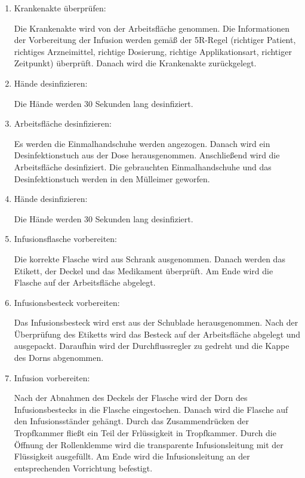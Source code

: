   \begin{enumerate}[start=0]
      \item Krankenakte überprüfen:
      
      Die Krankenakte wird von der Arbeitsfläche genommen. Die Informationen der Vorbereitung der Infusion werden gemäß der 5R-Regel (richtiger Patient, richtiges Arzneimittel, richtige Dosierung, richtige Applikationsart, richtiger Zeitpunkt) überprüft. Danach wird die Krankenakte zurückgelegt.
      
      \item Hände desinfizieren:
      
      Die Hände werden 30 Sekunden lang desinfiziert.
      
      \item Arbeitsfläche desinfizieren:
      
      Es werden die Einmalhandschuhe werden angezogen. Danach wird ein Desinfektionstuch aus der Dose herausgenommen. Anschließend wird die Arbeitsfläche desinfiziert. Die gebrauchten Einmalhandschuhe und das Desinfektionstuch werden in den Mülleimer geworfen.
      
      \item Hände desinfizieren:
      
      Die Hände werden 30 Sekunden lang desinfiziert.
      
      \item Infusionsflasche vorbereiten:
      
      Die korrekte Flasche wird aus Schrank ausgenommen. Danach werden das Etikett, der Deckel und das Medikament überprüft. Am Ende wird die Flasche auf der Arbeitsfläche abgelegt.
      
      \item Infusionsbesteck vorbereiten:
      
      Das Infusionsbesteck wird erst aus der Schublade herausgenommen. Nach der Überprüfung des Etiketts wird das Besteck auf der Arbeitsfläche abgelegt und ausgepackt. Daraufhin wird der Durchflussregler zu gedreht und die Kappe des Dorns abgenommen.
      
      \item Infusion vorbereiten:
      
      Nach der Abnahmen des Deckels der Flasche wird der Dorn des Infusionsbestecks in die Flasche eingestochen. Danach wird die Flasche auf den Infusionsständer gehängt. Durch das Zusammendrücken der Tropfkammer fließt ein Teil der Frlüssigkeit in Tropfkammer. Durch die Öffnung der Rollenklemme wird die transparente Infusionsleitung mit der Flüssigkeit ausgefüllt. Am Ende wird die Infusionsleitung an der entsprechenden Vorrichtung befestigt.
      

\end{enumerate}
